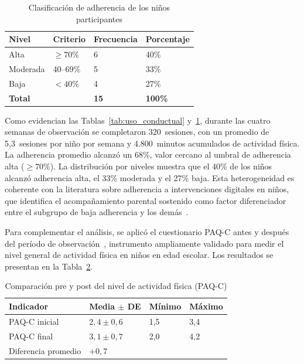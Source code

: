 				\begin{table}[H]
					\centering\small
					\caption{Clasificación de adherencia de los niños participantes}
					\label{tab:adherencia}
					\begin{tabular}{p{3.5cm}p{3.5cm}p{3.5cm}p{3cm}}
						\hline
						\textbf{Nivel} & \textbf{Criterio} & \textbf{Frecuencia} & \textbf{Porcentaje}\\
						\hline
						Alta & $\geq 70\%$ & 6 & 40\%\\
						Moderada & 40--69\% & 5 & 33\%\\
						Baja & $< 40\%$ & 4 & 27\%\\
						\textbf{Total} & & \textbf{15} & \textbf{100\%}\\
						\hline
					\end{tabular}
				\end{table}
				\tblnote
				
				Como evidencian las Tablas~\ref{tab:uso_conductual} y~\ref{tab:adherencia}, durante las cuatro semanas de observación se completaron 320~sesiones, con un promedio de 5,3~sesiones por niño por semana y 4.800~minutos acumulados de actividad física. La adherencia promedio alcanzó un 68\%, valor cercano al umbral de adherencia alta ($\geq 70\%$). La distribución por niveles muestra que el 40\% de los niños alcanzó adherencia alta, el 33\% moderada y el 27\% baja. Esta heterogeneidad es coherente con la literatura sobre adherencia a intervenciones digitales en niños, que identifica el acompañamiento parental sostenido como factor diferenciador entre el subgrupo de baja adherencia y los demás~\cite{Schoeppe2017,VegaDiaz2023}.
				
				Para complementar el análisis, se aplicó el cuestionario PAQ-C antes y después del período de observación~\cite{Kowalski2004,Benitez2016}, instrumento ampliamente validado para medir el nivel general de actividad física en niños en edad escolar. Los resultados se presentan en la Tabla~\ref{tab:paqc}.
				
				\begin{table}[H]
					\centering\small
					\caption{Comparación pre y post del nivel de actividad física (PAQ-C)}
					\label{tab:paqc}
					\begin{tabular}{p{3.5cm}p{3.5cm}p{3.5cm}p{3.5cm}}
						\hline
						\textbf{Indicador} & \textbf{Media $\pm$ DE} & \textbf{Mínimo} & \textbf{Máximo}\\
						\hline
						PAQ-C inicial & $2{,}4 \pm 0{,}6$ & 1,5 & 3,4\\
						PAQ-C final & $3{,}1 \pm 0{,}7$ & 2,0 & 4,2\\
						Diferencia promedio & $+0{,}7$ & & \\
						\hline
					\end{tabular}
				\end{table}
				\tblnote
				
